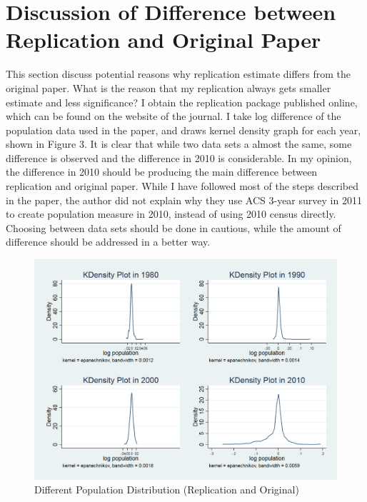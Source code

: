 \documentclass[12pt, final]{CSP}
\begin{document}
\section{Discussion of Difference between Replication and Original Paper}
\noindent
This section discuss potential reasons why replication estimate differs from the original paper.
\newline
\newline
What is the reason that my replication always gets smaller estimate and less significance? I obtain the replication package published online, which can be found on the website of the journal. I take log difference of the population data used in the paper, and draws kernel density graph for each year, shown in Figure 3. 
\newline
\newline
It is clear that while two data sets a almost the same, some difference is observed and the difference in 2010 is considerable. In my opinion, the difference in 2010 should be producing the main difference between replication and original paper. While I have followed most of the steps described in the paper, the author did not explain why they use ACS 3-year survey in 2011 to create population measure in 2010, instead of using 2010 census directly. Choosing between data sets should be done in cautious, while the amount of difference should be addressed in a better way.


\begin{figure}[h]
\caption{Different Population Distribution (Replication and Original)}
\centering
\includegraphics[width=1\textwidth]{KDtotpop_all.png}
\end{figure}
\end{document}
